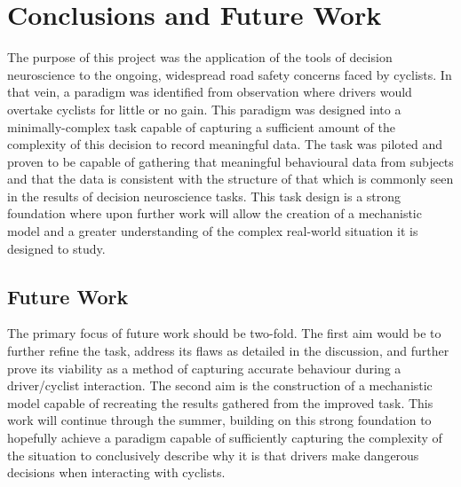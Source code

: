 \chapter[Conclusions]{Conclusions and Future Work}
The purpose of this project was the application of the tools of decision neuroscience to the ongoing, widespread road safety concerns faced by cyclists. In that vein, a paradigm was identified from observation where drivers would overtake cyclists for little or no gain. This paradigm was designed into a minimally-complex task capable of capturing a sufficient amount of the complexity of this decision to record meaningful data. The task was piloted and proven to be capable of gathering that meaningful behavioural data from subjects and that the data is consistent with the structure of that which is commonly seen in the results of decision neuroscience tasks. This task design is a strong foundation where upon further work will allow the creation of a mechanistic model and a greater understanding of the complex real-world situation it is designed to study.

\section{Future Work}
The primary focus of future work should be two-fold. The first aim would be to further refine the task, address its flaws as detailed in the discussion, and further prove its viability as a method of capturing accurate behaviour during a driver/cyclist interaction. The second aim is the construction of a mechanistic model capable of recreating the results gathered from the improved task. This work will continue through the summer, building on this strong foundation to hopefully achieve a paradigm capable of sufficiently capturing the complexity of the situation to conclusively describe why it is that drivers make dangerous decisions when interacting with cyclists.